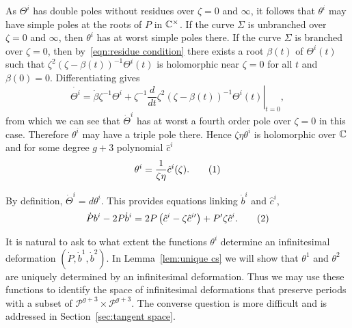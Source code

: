 \documentclass{article}
\begin{document}
As $\Theta^i$ has double poles without residues over $\zeta=0$ and $\infty$, it follows that $\theta^i$ may have simple poles at the roots of $P$ in $\mathbb{C}^\times$. 
If the curve $\Sigma$ is unbranched over $\zeta=0$ and $\infty$, then  $\theta^i$ has at worst simple poles there.
If the curve $\Sigma$ is branched over $\zeta=0$, then by~\eqref{eqn:residue condition} there exists a root $\beta(t)$ of $\Theta^i(t)$ such that $\zeta^2(\zeta-\beta(t))^{-1}\Theta^i(t)$ is holomorphic near $\zeta=0$ for all $t$ and $\beta(0)=0$. Differentiating gives
\[
\dot{\Theta^i} = \dot{\beta}\zeta^{-1}\Theta^i 
+ \zeta^{-1}\left.\frac{d}{dt} \zeta^2(\zeta-\beta(t))^{-1}\Theta^i(t) \right|_{t=0},
\]
from which we can see that $\dot{\Theta}^i$ has at worst a fourth order pole over $\zeta=0$ in this case. Therefore $\theta^i$ may have a triple pole there. 
Hence $\zeta\eta\theta^i$ is holomorphic over $\mathbb{C}$ and
for some degree $g+3$ polynomial $\hat{c}^i$
\[
\theta^i = \frac{1}{\zeta\eta}\hat{c}^i(\zeta).
\labelthis{eqn:def q dot}
\]

By definition, $\dot{\Theta}^i = d\theta^i$. This provides equations linking $\dot{b}^i$ and $\hat{c}^i$, 
\[
\dot{P} b^i - 2P\dot{b}^i = 2P\left( \hat{c}^i - \zeta\hat{c}^{i\prime} \right) + P'\zeta\hat{c}^i. \labelthis{eqn:EMPDi}
\]

It is natural to ask to what extent the functions $\theta^i$ determine an infinitesimal deformation $(\dot{P},\dot{b}^1,\dot{b}^2)$. In Lemma~\ref{lem:unique cs} we will show that $\theta^1$ and $\theta^2$ are uniquely determined by an infinitesimal deformation. Thus we may use these functions to identify the space of infinitesimal deformations that preserve periods with a subset of $\mathcal{P}^{g+3}\times \mathcal{P}^{g+3}$. The converse question is more difficult and is addressed in Section~\ref{sec:tangent space}.
\end{document}

